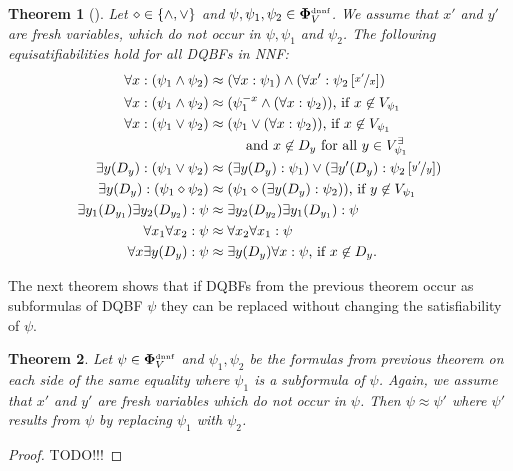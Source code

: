 \documentclass[
  digital, %
  twoside, %
  table,   %
  nolof,     %
  nolot,     %
]{fithesis3}
\let\setbuilder\set
\newcommand{\simpleset}[1]{\{{#1}\}}
\renewcommand{\set}[1]{\normalexpandarg\IfSubStr{#1}{|}{\setbuilder{#1}}{\simpleset{#1}}}
\newtheorem{theorem}{Theorem}[chapter] %
\theoremstyle{definition}
\theoremstyle{remark}
\newcommand{\substitute}[2]{\left[ \nicefrac{#2}{#1} \right]}
\newcommand{\DQBF}[1]{\mathbf{\Phi}_{#1}^{\text{\tiny dnnf}}}
\newcommand{\evars}[1]{V_{#1}^{\exists}}
\begin{document}
\begin{theorem}[{\cite[Theorem 3,4]{HQSquantifierLocalization}}]
\label{thrm:quantLocalEq}
  Let ${\diamond} \in \set{{\land},{\lor}}$ and $\psi,\psi_1,\psi_2 \in \DQBF{V}$. We assume that $x'$ and $y'$ are fresh variables, which do not occur in $\psi,\psi_1$ and $\psi_2$. The following equisatifiabilities hold for all DQBFs in NNF:
  \begin{align}
      \forall x : (\psi_1 \land \psi_2) &\approx (\forall x : \psi_1) \land (\forall x' : \psi_2\substitute{x}{x'}) \\
      \forall x : (\psi_1 \land \psi_2) &\approx (\psi_1^{-x} \land (\forall x : \psi_2)) \text{, if } x \not\in V_{\psi_1} \\
      \forall x : (\psi_1 \lor \psi_2) &\approx \begin{multlined}[t][3cm](\psi_1 \lor (\forall x : \psi_2)) \text{, if } x \not\in V_{\psi_1}\\
      \text{ and } x \not\in D_y \text{ for all } y \in \evars{\psi_1}\end{multlined} \\
      \exists y(D_y) : (\psi_1 \lor \psi_2) &\approx (\exists y(D_y) : \psi_1) \lor (\exists y'(D_y) : \psi_2\substitute{y}{y'}) \\
      \exists y(D_y) : (\psi_1 \diamond \psi_2) &\approx (\psi_1 \diamond (\exists y(D_y) : \psi_2)) \text{, if } y \not\in V_{\psi_1} \\
      \exists y_1(D_{y_1})\exists y_2(D_{y_2}) : \psi &\approx \exists y_2(D_{y_2}) \exists y_1(D_{y_1}) : \psi \\
      \forall x_1\forall x_2 : \psi &\approx \forall x_2\forall x_1 : \psi \\
      \forall x\exists y(D_y) : \psi &\approx \exists y(D_y)\forall x : \psi\text{, if } x \not\in D_y.
  \end{align}
\end{theorem}

The next theorem shows that if DQBFs from the previous theorem occur as subformulas of DQBF $\psi$ they can be replaced without changing the satisfiability of $\psi$.

\begin{theorem}
  Let $\psi \in \DQBF{V}$ and $\psi_1, \psi_2$ be the formulas from previous theorem on each side of the same equality where $\psi_1$ is a subformula of $\psi$. Again, we assume that $x'$ and $y'$ are fresh variables which do not occur in $\psi$. Then $\psi \approx \psi'$ where $\psi'$ results from $\psi$ by replacing $\psi_1$ with $\psi_2$.
\end{theorem}
\begin{proof}
  TODO!!!
\end{proof}
\end{document}
